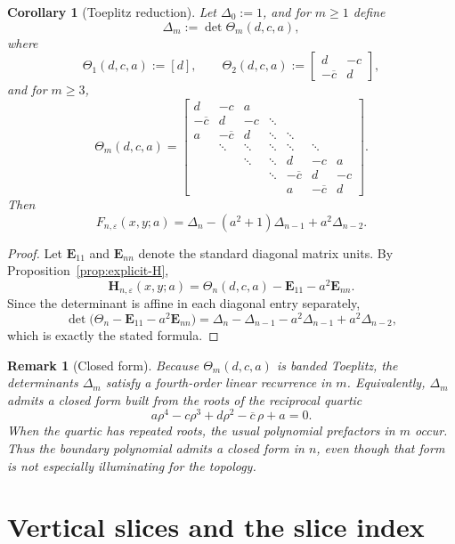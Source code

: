 \documentclass[11pt]{article}
\newtheorem{corollary}[theorem]{Corollary}
\newtheorem{remark}[theorem]{Remark}
\begin{document}
\begin{corollary}[Toeplitz reduction]\label{cor:Toeplitz-reduction}
Let \(\Delta_0:=1\), and for \(m\ge 1\) define
\[
\Delta_m:=\det \Theta_m(d,c,a),
\]
where
\[
\Theta_1(d,c,a):=[d],
\qquad
\Theta_2(d,c,a):=
\begin{bmatrix}
d & -c\\
-\overline c & d
\end{bmatrix},
\]
and for \(m\ge 3\),
\[
\Theta_m(d,c,a)=
\begin{bmatrix}
d & -c & a \\
-\overline c & d & -c & \ddots \\
a & -\overline c & d & \ddots & \ddots \\
& \ddots & \ddots & \ddots & \ddots & \ddots \\
&& \ddots & \ddots & d & -c & a \\
&&& \ddots & -\overline c & d & -c \\
&&&& a & -\overline c & d
\end{bmatrix}.
\]
Then
\[
F_{n,\varepsilon}(x,y;a)
=
\Delta_n-(a^2+1)\Delta_{n-1}+a^2\Delta_{n-2}.
\]
\end{corollary}

\begin{proof}
Let \(\mathbf E_{11}\) and \(\mathbf E_{nn}\) denote the standard diagonal matrix units. By Proposition~\ref{prop:explicit-H},
\[
\mathbf H_{n,\varepsilon}(x,y;a)
=
\Theta_n(d,c,a)-\mathbf E_{11}-a^2\mathbf E_{nn}.
\]
Since the determinant is affine in each diagonal entry separately,
\[
\det\bigl(\Theta_n-\mathbf E_{11}-a^2\mathbf E_{nn}\bigr)
=
\Delta_n-\Delta_{n-1}-a^2\Delta_{n-1}+a^2\Delta_{n-2},
\]
which is exactly the stated formula.
\end{proof}

\begin{remark}[Closed form]\label{rem:quartic}
Because \(\Theta_m(d,c,a)\) is banded Toeplitz, the determinants \(\Delta_m\) satisfy a fourth-order linear recurrence in \(m\). Equivalently, \(\Delta_m\) admits a closed form built from the roots of the reciprocal quartic
\[
a\rho^4-c\rho^3+d\rho^2-\overline c\,\rho+a=0.
\]
When the quartic has repeated roots, the usual polynomial prefactors in \(m\) occur. Thus the boundary polynomial admits a closed form in \(n\), even though that form is not especially illuminating for the topology.
\end{remark}

\section{Vertical slices and the slice index}
\end{document}

